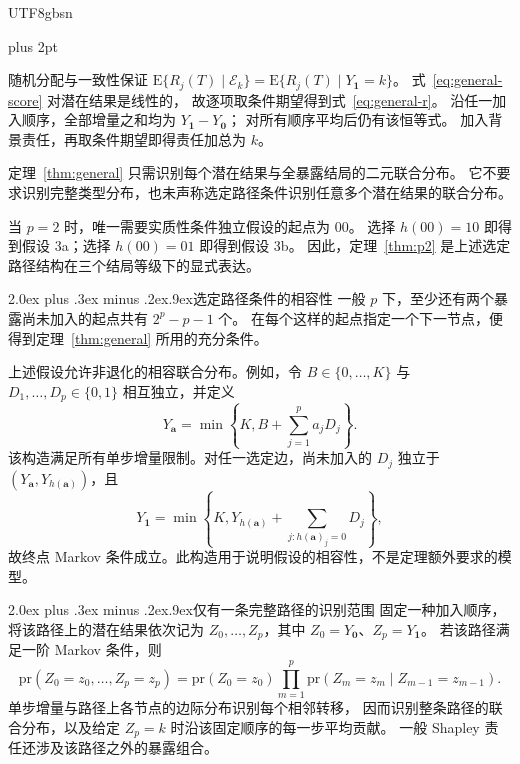 \documentclass[11pt,a4paper]{article}
\makeatletter
\newcommand{\headingweight}{\ifPDFTeX\mdseries\else\bfseries\fi}
\renewcommand{\section}{\@startsection{section}{1}{0pt}
  {2.0ex plus .3ex minus .2ex}{.9ex}{\normalfont\large\headingweight}}
\theoremstyle{report}
\renewenvironment{proof}[1][证明]{\par\pushQED{\qed}\normalfont
  \topsep=6pt plus 2pt\relax\trivlist
  \item[\hskip\labelsep{\headingweight #1。}]\ignorespaces}
  {\popQED\endtrivlist\@endpefalse}
\newcommand{\pr}{\mathrm{pr}}
\newcommand{\E}{\mathrm E}
\newcommand{\avec}{\boldsymbol a}
\newcommand{\zero}{\boldsymbol 0}
\newcommand{\one}{\boldsymbol 1}
\makeatother
\begin{document}
\begin{CJK*}{UTF8}{gbsn}
\begin{proof}
随机分配与一致性保证
$\E\{R_j(T)\mid\mathcal E_k\}=\E\{R_j(T)\mid Y_{\one}=k\}$。
式~\eqref{eq:general-score} 对潜在结果是线性的，
故逐项取条件期望得到式~\eqref{eq:general-r}。
沿任一加入顺序，全部增量之和均为 $Y_{\one}-Y_{\zero}$；
对所有顺序平均后仍有该恒等式。
加入背景责任，再取条件期望即得责任加总为 $k$。
\end{proof}

定理~\ref{thm:general} 只需识别每个潜在结果与全暴露结局的二元联合分布。
它不要求识别完整类型分布，也未声称选定路径条件识别任意多个潜在结果的联合分布。

当 $p=2$ 时，唯一需要实质性条件独立假设的起点为 $00$。
选择 $h(00)=10$ 即得到假设 3a；选择 $h(00)=01$ 即得到假设 3b。
因此，定理~\ref{thm:p2} 是上述选定路径结构在三个结局等级下的显式表达。

\section{选定路径条件的相容性}
一般 $p$ 下，至少还有两个暴露尚未加入的起点共有 $2^p-p-1$ 个。
在每个这样的起点指定一个下一节点，便得到定理~\ref{thm:general} 所用的充分条件。

上述假设允许非退化的相容联合分布。例如，令 $B\in\{0,\ldots,K\}$
与 $D_1,\ldots,D_p\in\{0,1\}$ 相互独立，并定义
\[
Y_{\avec}=\min\left\{K,B+\sum_{j=1}^{p}a_jD_j\right\}.
\]
该构造满足所有单步增量限制。对任一选定边，尚未加入的 $D_j$
独立于 $(Y_{\avec},Y_{h(\avec)})$，且
\[
Y_{\one}=\min\left\{K,Y_{h(\avec)}+
               \sum_{j:h(\avec)_j=0}D_j\right\},
\]
故终点 Markov 条件成立。此构造用于说明假设的相容性，不是定理额外要求的模型。

\clearpage
\section{仅有一条完整路径的识别范围}
固定一种加入顺序，将该路径上的潜在结果依次记为
$Z_0,\ldots,Z_p$，其中 $Z_0=Y_{\zero}$、$Z_p=Y_{\one}$。
若该路径满足一阶 Markov 条件，则
\[
\pr(Z_0=z_0,\ldots,Z_p=z_p)
=\pr(Z_0=z_0)\prod_{m=1}^{p}
  \pr(Z_m=z_m\mid Z_{m-1}=z_{m-1}).
\]
单步增量与路径上各节点的边际分布识别每个相邻转移，
因而识别整条路径的联合分布，以及给定 $Z_p=k$ 时沿该固定顺序的每一步平均贡献。
一般 Shapley 责任还涉及该路径之外的暴露组合。


\end{CJK*}
\end{document}
